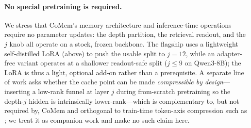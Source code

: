 \paragraph{No special pretraining is required.} We stress that CoMem's memory
architecture and inference-time operations require no parameter updates: the
depth partition, the retrieval readout, and the $j$ knob all operate on a stock,
frozen backbone. The flagship uses a lightweight self-distilled LoRA (above) to
push the usable split to $j{=}12$, while an adapter-free variant operates at a
shallower readout-safe split ($j{\le}9$ on Qwen3-8B); the LoRA is thus a light,
optional add-on rather than a prerequisite. A separate line of work asks whether
the cache point can be made \emph{compressible by design}---inserting a
low-rank funnel at layer $j$ during from-scratch pretraining so the depth-$j$
hidden is intrinsically lower-rank---which is complementary to, but not required
by, CoMem and orthogonal to train-time token-axis compression such as
\citet{kvcat}; we treat it as companion work and make no such claim here.
